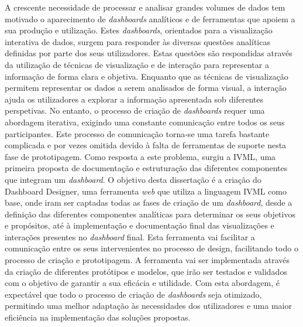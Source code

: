 
%

A crescente necessidade de processar e analisar grandes volumes de dados tem motivado o aparecimento de \textit{dashboards} analíticos e de ferramentas que apoiem a sua produção e utilização. Estes \textit{dashboards}, orientados para a visualização interativa de dados, surgem para responder às diversas questões analíticas definidas por parte dos seus utilizadores. Estas questões são respondidas através da utilização de técnicas de visualização e de interação para representar a informação de forma clara e objetiva. Enquanto que as técnicas de visualização permitem representar os dados a serem analisados de forma visual, a interação ajuda os utilizadores a explorar a informação apresentada sob diferentes perspetivas. No entanto, o processo de criação de \textit{dashboards} requer uma abordagem iterativa, exigindo uma constante comunicação entre todos os seus participantes. Este processo de comunicação torna-se uma tarefa bastante complicada e por vezes omitida devido à falta de ferramentas de suporte nesta fase de prototipagem. Como resposta a este problema, surgiu a \gls{IVML}, uma primeira proposta de documentação e estruturação das diferentes componentes que integram um \textit{dashboard}. O objetivo desta dissertação é a criação do Dashboard Designer, uma ferramenta \textit{web} que utiliza a linguagem \gls{IVML} como base, onde iram ser captadas todas as fases de criação de um \textit{dashboard}, desde a definição das diferentes componentes analíticas para determinar os seus objetivos e propósitos, até à implementação e documentação final das visualizações e interações presentes no \textit{dashboard} final. Esta ferramenta vai facilitar a comunicação entre os seus intervenientes no processo de design, facilitando todo o processo de criação e prototipagem. A ferramenta vai ser implementada através da criação de diferentes protótipos e modelos, que irão ser testados e validados com o objetivo de garantir a sua eficácia e utilidade. Com esta abordagem, é expectável que todo o processo de criação de \textit{dashboards} seja otimizado, permitindo uma melhor adaptação às necessidades dos utilizadores e uma maior eficiência na implementação das soluções propostas.


